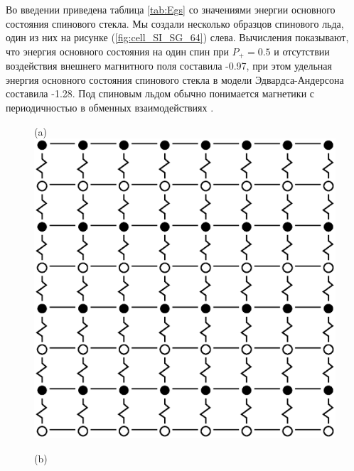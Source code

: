 \documentclass[utf8, babel, sor, jor, amsmath, amssymb, reprint]{elsarticle} %
\begin{document}
Во введении приведена таблица \ref{tab:Egs} со значениями энергии основного состояния спинового стекла. Мы создали несколько образцов спинового льда, один из них на рисунке (\ref{fig:cell_SI_SG_64}) слева. Вычисления показывают, что энергия основного состояния на один спин при $P_+ = 0.5$ и отсутствии воздействия внешнего магнитного поля составила -0.97, при этом удельная энергия основного состояния спинового стекла в модели Эдвардса-Андерсона составила -1.28. Под спиновым льдом обычно понимается магнетики с периодичностью в обменных взаимодействиях \cite{peretyatko2017interplay, otsuka2018husimi, andriushchenko2019large, shevchenko2017effect, kato2022flux}. 

\begin{figure}[H]
	\begin{minipage}[h]{0.3\linewidth}
		\centering(a)
		\includegraphics[width=1\linewidth]{pictures/SI_64_J0_1}
	\end{minipage}
	\hfill
	\begin{minipage}[h]{0.3\linewidth}
	\centering(b)

\end{minipage}
\end{figure}
\end{document}
